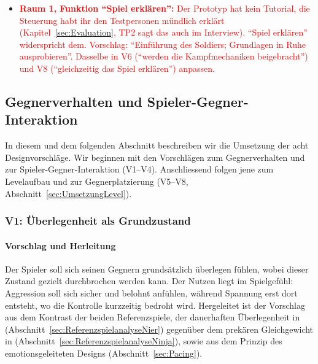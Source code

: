 \documentclass[../Main.tex]{subfiles}
\begin{document}
\begin{itemize}[leftmargin=1.5cm]
{\begin{itemize}
        \item \textbf{Raum 12} (optional): Finale, zuerst nur ein einzelner Archer in der Mitte, danach die grösste Eskalation (bis zu acht Gegner gleichzeitig). TP1 hatte viele Gegner erwartet, und es \enquote{nahm dann richtig Fahrt auf} (TP1, I2).
    \end{itemize}
    Achtung: Zu Raum 4, 6 und 11 steht die Absicht teilweise schon in V6 und V8. Entweder hier ausführlich und dort nur verweisen, oder hier kurz und auf V6 bzw.\ V8 verweisen, damit es nicht doppelt steht.}
    \item \textcolor{red}{\textbf{Raum 1, Funktion \enquote{Spiel erklären}:} Der Prototyp hat kein Tutorial, die Steuerung habt ihr den Testpersonen mündlich erklärt (Kapitel~\ref{sec:Evaluation}, TP2 sagt das auch im Interview). \enquote{Spiel erklären} widerspricht dem. Vorschlag: \enquote{Einführung des Soldiers; Grundlagen in Ruhe ausprobieren}. Dasselbe in V6 (\enquote{werden die Kampfmechaniken beigebracht}) und V8 (\enquote{gleichzeitig das Spiel erklären}) anpassen.}
\end{itemize}

\subsection{Gegnerverhalten und Spieler-Gegner-Interaktion} \label{sec:UmsetzungGegner}

In diesem und dem folgenden Abschnitt beschreiben wir die Umsetzung der acht Designvorschläge. Wir beginnen mit den Vorschlägen zum Gegnerverhalten und zur Spieler-Gegner-Interaktion (V1--V4). Anschliessend folgen jene zum Levelaufbau und zur Gegnerplatzierung (V5--V8, Abschnitt~\ref{sec:UmsetzungLevel}).

\subsubsection{V1: Überlegenheit als Grundzustand} \label{sec:V1}

\paragraph{Vorschlag und Herleitung}
Der Spieler soll sich seinen Gegnern grundsätzlich überlegen fühlen, wobei dieser Zustand gezielt durchbrochen werden kann. Der Nutzen liegt im Spielgefühl: Aggression soll sich sicher und belohnt anfühlen, während Spannung erst dort entsteht, wo die Kontrolle kurzzeitig bedroht wird. Hergeleitet ist der Vorschlag aus dem Kontrast der beiden Referenzspiele, der dauerhaften Überlegenheit in  (Abschnitt~\ref{sec:ReferenzspielanalyseNier}) gegenüber dem prekären Gleichgewicht in  (Abschnitt~\ref{sec:ReferenzspielanalyseNinja}), sowie aus dem Prinzip des emotionsgeleiteten Designs (Abschnitt~\ref{sec:Pacing}).
\end{document}
